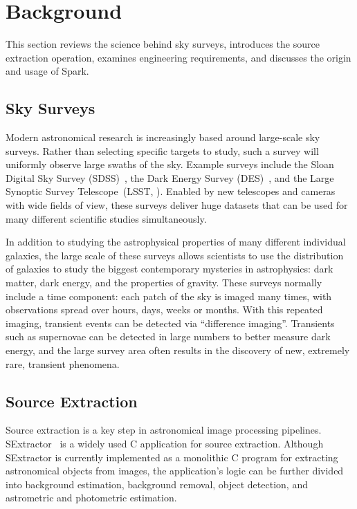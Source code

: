 \documentclass[conference]{IEEEtran}
\begin{document}
\section{Background}
\label{sec:Background}

This section reviews the science behind sky surveys, introduces the source extraction operation, examines engineering requirements, and discusses the origin and usage of Spark.

\subsection{Sky Surveys}

Modern astronomical research is increasingly based around large-scale sky surveys.
Rather than selecting specific targets to study, such a survey will uniformly observe large
swaths of the sky. Example surveys include the Sloan Digital Sky Survey (SDSS)~\cite{york00},
the Dark Energy Survey (DES)~\cite{dark05}, and the Large Synoptic Survey Telescope~(LSST,
\cite{ivezic08}). Enabled by new telescopes and cameras with wide fields of view, these
surveys deliver huge datasets that can be used for many different scientific studies
simultaneously.

In addition to studying the astrophysical properties of many different individual galaxies,
the large scale of these surveys allows scientists to use the distribution of galaxies to
study the biggest contemporary mysteries in astrophysics: dark matter, dark energy, and 
the properties of gravity. These surveys normally include a time component: each patch of the sky is imaged many times,
with observations spread over hours, days, weeks or months. With this repeated imaging,
transient events can be detected via ``difference imaging''. Transients such as supernovae
can be detected in large numbers to better measure dark energy, and the large survey area
often results in the discovery of new, extremely rare, transient phenomena.

\subsection{Source Extraction}
\label{sec:Background-SE}
Source extraction is a key step in astronomical image processing pipelines.
SExtractor~\cite{bertin96} is a widely used C application for source extraction.
Although SExtractor is currently implemented as a monolithic C program for extracting astronomical
objects from images, the application's logic can be further divided into 
background estimation, background removal, object detection, and astrometric 
and photometric estimation.
\end{document}
